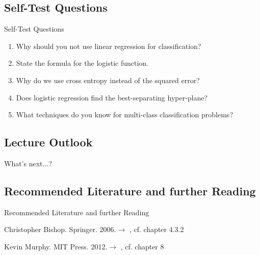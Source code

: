 \subsection{Self-Test Questions}

\begin{frame}{Self-Test Questions}{}\important
	\begin{enumerate}
		\item Why should you not use linear regression for classification?
		\item State the formula for the logistic function.
		\item Why do we use cross entropy instead of the squared error?
		\item Does logistic regression find the best-separating hyper-plane?
		\item What techniques do you know for multi-class classification problems?
	\end{enumerate}
\end{frame}


\subsection{Lecture Outlook}

\begin{frame}{What's next...?}{}
\end{frame}


\subsection{Recommended Literature and further Reading}

\begin{frame}[allowframebreaks]{Recommended Literature and further Reading}{}
	\footnotesize
	\begin{thebibliography}{2}
			{Christopher Bishop. Springer. 2006.}{$\rightarrow$ \href{
				http://users.isr.ist.utl.pt/~wurmd/Livros/school/Bishop\%20-\%20Pattern\%20Recognition\%20And\%20Machine\%20Learning\%20-\%20Springer\%20\%202006.pdf
			}{}, cf. chapter 4.3.2}

			{Kevin Murphy. MIT Press. 2012.}{$\rightarrow$ \href{
				https://doc.lagout.org/science/Artificial\%20Intelligence/Machine\%20learning/Machine\%20Learning_\%20A\%20Probabilistic\%20Perspective\%20\%5BMurphy\%202012-08-24\%5D.pdf
			}{}, cf. chapter 8}
	\end{thebibliography}
\end{frame}



